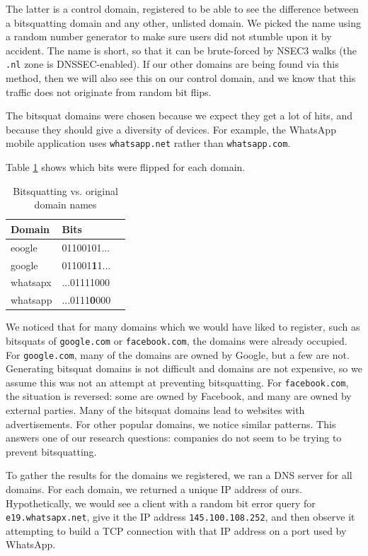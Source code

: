 \documentclass[conference]{IEEEtran}
\begin{document}
The latter is a control domain, registered to be able to see the difference
between a bitsquatting domain and any other, unlisted domain. We picked the
name using a random number generator to make sure users did not stumble upon it
by accident. The name is short, so that it can be brute-forced by NSEC3 walks
(the \texttt{.nl} zone is DNSSEC-enabled). If our other domains are being found
via this method, then we will also see this on our control domain, and we know
that this traffic does not originate from random bit flips.

The bitsquat domains were chosen because we expect they get a lot of hits, and
because they should give a diversity of devices. For example, the WhatsApp
mobile application uses \texttt{whatsapp.net} rather than
\texttt{whatsapp.com}.

Table \ref{tab:bits} shows which bits were flipped for each domain.

\begin{table}[H]
  \centering
  \caption{Bitsquatting vs. original domain names}
  \label{tab:bits}
  \begin{tabular}{|l|l|l|}
    \hline
    \textbf{Domain}   & \textbf{Bits} \\ \hline
    eoogle   & 01100101... \\ \hline
    google   & 011001\textbf{1}1... \\ \hline
    whatsapx & ...01111000 \\ \hline
    whatsapp & ...0111\textbf{0}000 \\ \hline
   \end{tabular}
\end{table}

We noticed that for many domains which we would have liked to register, such as
bitsquats of \texttt{google.com} or \texttt{facebook.com}, the domains were
already occupied. For \texttt{google.com}, many of the domains are owned by
Google, but a few are not. Generating bitsquat domains is not difficult and
domains are not expensive, so we assume this was not an attempt at preventing
bitsquatting. For \texttt{facebook.com}, the situation is reversed: some are
owned by Facebook, and many are owned by external parties. Many of the bitsquat
domains lead to websites with advertisements. For other popular domains, we
notice similar patterns. This answers one of our research questions: companies
do not seem to be trying to prevent bitsquatting.

To gather the results for the domains we registered, we ran a DNS server for
all domains. For each domain, we returned a unique IP address of ours.
Hypothetically, we would see a client with a random bit error query for
\texttt{e19.whatsapx.net}, give it the IP address \texttt{145.100.108.252}, and
then observe it attempting to build a TCP connection with that IP address on a
port used by WhatsApp.
\end{document}
